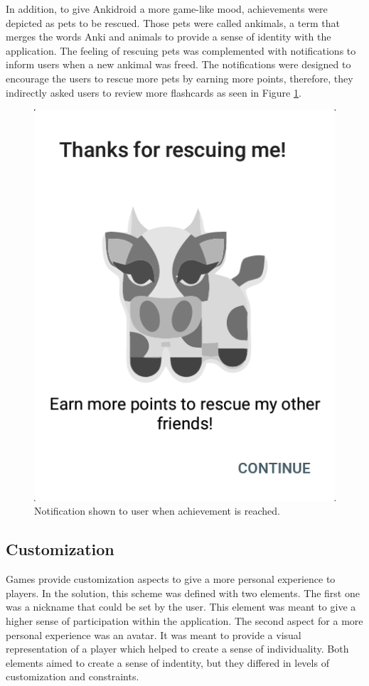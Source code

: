 In addition, to give Ankidroid a more game-like mood, achievements were depicted as pets to be rescued. Those pets were called ankimals, a term that merges the words Anki and animals to provide a sense of identity with the application. The feeling of rescuing pets was complemented with notifications to inform users when a new ankimal was freed. The notifications were designed to encourage the users to rescue more pets by earning more points, therefore, they indirectly asked users to review more flashcards as seen in Figure \ref{fig:ankimals-rescue}.

\begin{figure}[htb]
    \vskip 5mm
        \begin{center}
            \includegraphics[scale=0.5]{./Figures/achievement_notification.png}
            \caption{Notification shown to user when achievement is reached.}
            \label{fig:ankimals-rescue}
        \end{center}
    \vskip -5mm
\end{figure}

\subsection{Customization}
Games provide customization aspects to give a more personal experience to players. In the solution, this scheme was defined with two elements. The first one was a nickname that could be set by the user. This element was meant to give a higher sense of participation within the application. The second aspect for a more personal experience was an avatar. It was meant to provide a visual representation of a player which helped to create a sense of individuality. Both elements aimed to create a sense of indentity, but they differed in levels of customization and constraints.

